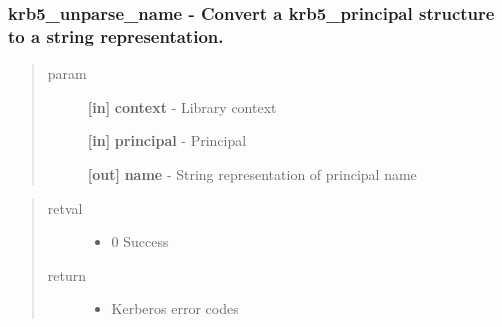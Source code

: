 \documentclass[letterpaper,10pt,english]{sphinxmanual}
\begin{document}
\subsubsection{krb5\_unparse\_name -  Convert a krb5\_principal structure to a string representation.}
\label{appdev/refs/api/krb5_unparse_name:krb5-unparse-name-convert-a-krb5-principal-structure-to-a-string-representation}\label{appdev/refs/api/krb5_unparse_name::doc}

\begin{fulllineitems}
\label{appdev/refs/api/krb5_unparse_name:krb5_unparse_name}
\end{fulllineitems}

\begin{quote}\begin{description}
\item[{param}] \leavevmode
\textbf{{[}in{]}} \textbf{context} - Library context

\textbf{{[}in{]}} \textbf{principal} - Principal

\textbf{{[}out{]}} \textbf{name} - String representation of principal name

\end{description}\end{quote}
\begin{quote}\begin{description}
\item[{retval}] \leavevmode\begin{itemize}
\item {} 
0   Success

\end{itemize}

\item[{return}] \leavevmode\begin{itemize}
\item {} 
Kerberos error codes

\end{itemize}

\end{description}\end{quote}
\end{document}
